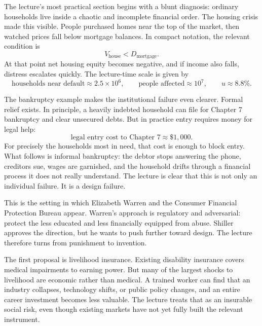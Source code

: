 The lecture's most practical section begins with a blunt diagnosis: ordinary households live inside a chaotic and incomplete financial order. The housing crisis made this visible. People purchased homes near the top of the market, then watched prices fall below mortgage balances. In compact notation, the relevant condition is
\begin{equation}
V_{\text{house}} < D_{\text{mortgage}}.
\end{equation}
At that point net housing equity becomes negative, and if income also falls, distress escalates quickly. The lecture-time scale is given by
\begin{equation}
\text{households near default} \approx 2.5\times 10^6,\qquad
\text{people affected} \approx 10^7,\qquad
u \approx 8.8\%.
\end{equation}

The bankruptcy example makes the institutional failure even clearer. Formal relief exists. In principle, a heavily indebted household can file for Chapter 7 bankruptcy and clear unsecured debts. But in practice entry requires money for legal help:
\begin{equation}
\text{legal entry cost to Chapter 7} \approx \$1{,}000.
\end{equation}
For precisely the households most in need, that cost is enough to block entry. What follows is informal bankruptcy: the debtor stops answering the phone, creditors sue, wages are garnished, and the household drifts through a financial process it does not really understand. The lecture is clear that this is not only an individual failure. It is a design failure.

This is the setting in which Elizabeth Warren and the Consumer Financial Protection Bureau appear. Warren's approach is regulatory and adversarial: protect the less educated and less financially equipped from abuse. Shiller approves the direction, but he wants to push further toward design. The lecture therefore turns from punishment to invention.

The first proposal is livelihood insurance. Existing disability insurance covers medical impairments to earning power. But many of the largest shocks to livelihood are economic rather than medical. A trained worker can find that an industry collapses, technology shifts, or public policy changes, and an entire career investment becomes less valuable. The lecture treats that as an insurable social risk, even though existing markets have not yet fully built the relevant instrument.

